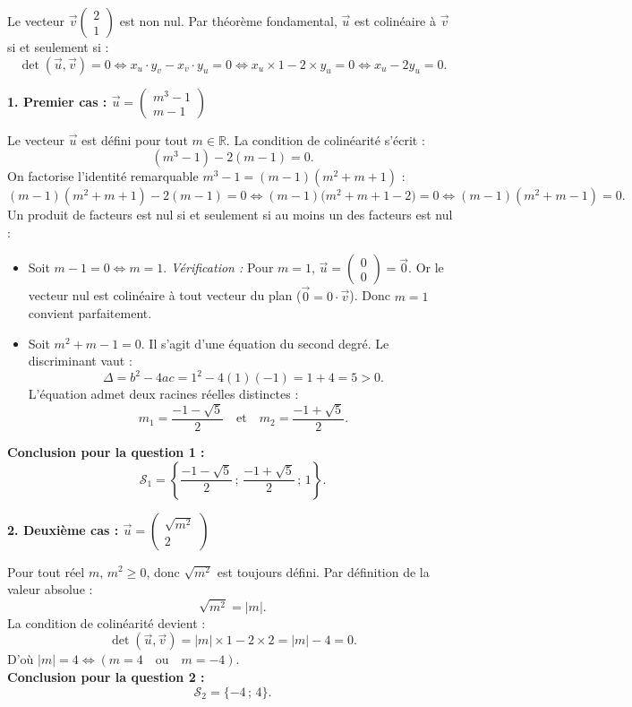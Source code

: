 \documentclass[11pt,a4paper]{article}
\newcommand{\R}{\mathbb{R}}
\renewcommand{\det}{\operatorname{det}}
\begin{document}
\begin{correctionbox}
Le vecteur $\vec{v}\begin{pmatrix} 2 \\ 1 \end{pmatrix}$ est non nul. Par théorème fondamental, $\vec{u}$ est colinéaire à $\vec{v}$ si et seulement si :
\[
\det(\vec{u}, \vec{v}) = 0 \iff x_u \cdot y_v - x_v \cdot y_u = 0 \iff x_u \times 1 - 2 \times y_u = 0 \iff x_u - 2 y_u = 0.
\]

\textbf{1. Premier cas : $\vec{u} = \begin{pmatrix} m^3 - 1 \\ m - 1 \end{pmatrix}$}

Le vecteur $\vec{u}$ est défini pour tout $m \in \R$. La condition de colinéarité s'écrit :
\[
(m^3 - 1) - 2(m - 1) = 0.
\]
On factorise l'identité remarquable $m^3 - 1 = (m - 1)(m^2 + m + 1)$ :
\[
(m - 1)(m^2 + m + 1) - 2(m - 1) = 0 \iff (m - 1)\bigl(m^2 + m + 1 - 2\bigr) = 0 \iff (m - 1)(m^2 + m - 1) = 0.
\]
Un produit de facteurs est nul si et seulement si au moins un des facteurs est nul :
\begin{itemize}[leftmargin=1cm]
    \item Soit $m - 1 = 0 \iff m = 1$.
    \textit{Vérification :} Pour $m = 1$, $\vec{u} = \begin{pmatrix} 0 \\ 0 \end{pmatrix} = \vec{0}$. Or le vecteur nul est colinéaire à tout vecteur du plan ($\vec{0} = 0 \cdot \vec{v}$). Donc $m = 1$ convient parfaitement.
    \item Soit $m^2 + m - 1 = 0$. Il s'agit d'une équation du second degré. Le discriminant vaut :
    \[
    \Delta = b^2 - 4ac = 1^2 - 4(1)(-1) = 1 + 4 = 5 > 0.
    \]
    L'équation admet deux racines réelles distinctes :
    \[
    m_1 = \frac{-1 - \sqrt{5}}{2} \quad \text{et} \quad m_2 = \frac{-1 + \sqrt{5}}{2}.
    \]
\end{itemize}
\textbf{Conclusion pour la question 1 :}
\[
\mathcal{S}_1 = \left\{ \frac{-1 - \sqrt{5}}{2} \,;\, \frac{-1 + \sqrt{5}}{2} \,;\, 1 \right\}.
\]

\textbf{2. Deuxième cas : $\vec{u} = \begin{pmatrix} \sqrt{m^2} \\ 2 \end{pmatrix}$}

Pour tout réel $m$, $m^2 \ge 0$, donc $\sqrt{m^2}$ est toujours défini. Par définition de la valeur absolue :
\[
\sqrt{m^2} = |m|.
\]
La condition de colinéarité devient :
\[
\det(\vec{u}, \vec{v}) = |m| \times 1 - 2 \times 2 = |m| - 4 = 0.
\]
D'où $|m| = 4 \iff (m = 4 \quad \text{ou} \quad m = -4)$.\\
\textbf{Conclusion pour la question 2 :}
\[
\mathcal{S}_2 = \{-4 \,;\, 4\}.
\]


\end{correctionbox}
\end{document}
